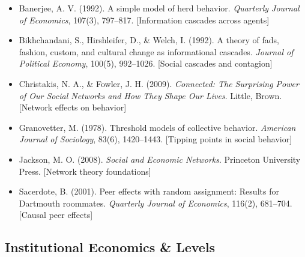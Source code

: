 \begin{itemize}

\item Banerjee, A. V. (1992). 
A simple model of herd behavior. 
\textit{Quarterly Journal of Economics}, 107(3), 797--817.
[Information cascades across agents]

\item Bikhchandani, S., Hirshleifer, D., \& Welch, I. (1992). 
A theory of fads, fashion, custom, and cultural change as informational cascades. 
\textit{Journal of Political Economy}, 100(5), 992--1026.
[Social cascades and contagion]

\item Christakis, N. A., \& Fowler, J. H. (2009). 
\textit{Connected: The Surprising Power of Our Social Networks and How They Shape Our Lives}. 
Little, Brown.
[Network effects on behavior]

\item Granovetter, M. (1978). 
Threshold models of collective behavior. 
\textit{American Journal of Sociology}, 83(6), 1420--1443.
[Tipping points in social behavior]

\item Jackson, M. O. (2008). 
\textit{Social and Economic Networks}. 
Princeton University Press.
[Network theory foundations]

\item Sacerdote, B. (2001). 
Peer effects with random assignment: Results for Dartmouth roommates. 
\textit{Quarterly Journal of Economics}, 116(2), 681--704.
[Causal peer effects]

\end{itemize}

\subsection*{Institutional Economics \& Levels}

